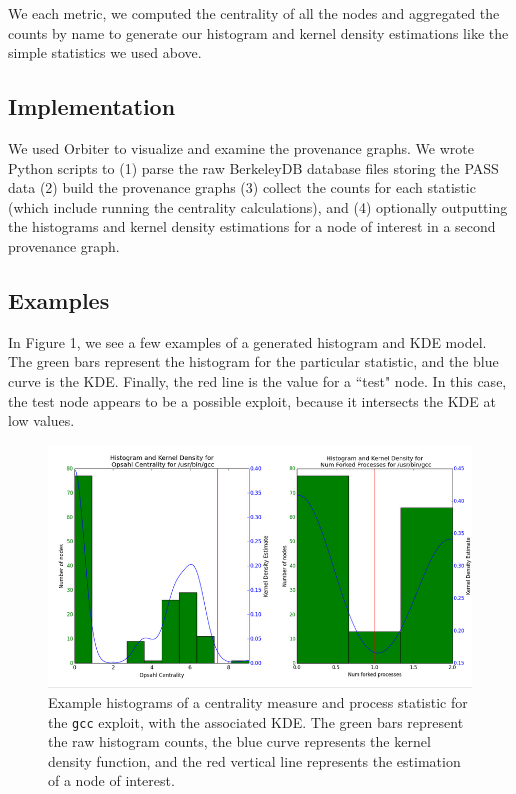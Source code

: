 \documentclass[10pt,twocolumn]{article}
\begin{document}
We each metric, we computed the centrality of all the nodes and aggregated the counts by name to generate our histogram and kernel density estimations like the simple statistics we used above.

\subsection{Implementation}
We used Orbiter \cite{orbiter} to visualize and examine the provenance graphs. We wrote Python scripts to (1) parse the raw BerkeleyDB database files storing the PASS data (2) build the provenance graphs (3) collect the counts for each statistic (which include running the centrality calculations), and (4) optionally outputting the histograms and kernel density estimations for a node of interest in a second provenance graph.

\subsection{Examples}
In Figure 1, we see a few examples of a generated histogram and KDE model. The green bars represent the histogram for the particular statistic, and the blue curve is the KDE. Finally, the red line is the value for a ``test" node. In this case, the test node appears to be a possible exploit, because it intersects the KDE at low values. 
\begin{figure}
  \caption{Example histograms of a centrality measure and process statistic for the \texttt{gcc} exploit, with the associated KDE. The green bars represent the raw histogram counts, the blue curve represents the kernel density function, and the red vertical line represents the estimation of a node of interest.}
  \centering
    \includegraphics[width=\textwidth]{img/hist.png}
\end{figure}
\end{document}
